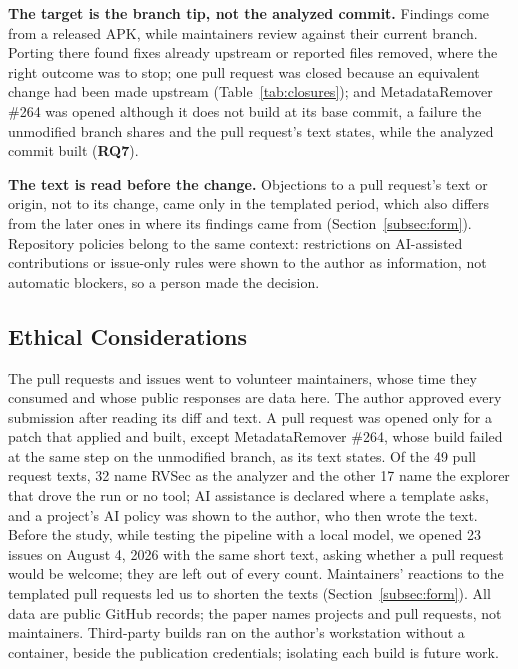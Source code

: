 \documentclass[conference]{IEEEtran}
\newcommand{\researchq}[1]{\textbf{RQ#1}}
\begin{document}
\textbf{The target is the branch tip, not the analyzed commit.} Findings come
from a released APK, while maintainers review against their current branch.
Porting there found fixes already upstream or reported files removed, where
the right outcome was to stop; one pull request was closed because an
equivalent change had been made upstream (Table~\ref{tab:closures}); and
MetadataRemover \#264 was opened although it does not build at its base
commit, a failure the unmodified branch shares and the pull request's text
states, while the analyzed commit built (\researchq{7}).

\textbf{The text is read before the change.} Objections to a pull request's
text or origin, not to its change, came only in the templated period, which
also differs from the later ones in where its findings came from
(Section~\ref{subsec:form}). Repository policies belong to
the same context: restrictions on AI-assisted contributions or issue-only
rules were shown to the author as information, not automatic blockers, so a
person made the decision.

\subsection{Ethical Considerations}
\label{subsec:ethics}

The pull requests and issues went to volunteer maintainers, whose time they
consumed and whose public responses are data here. The author approved every
submission after reading its diff and text. A pull request was opened only for
a patch that applied and built, except MetadataRemover \#264, whose build
failed at the same step on the unmodified branch, as its text states. Of the
49 pull request texts, 32 name RVSec as the analyzer and the other 17 name the
explorer that drove the run or no tool; AI assistance is declared where a
template asks, and a project's AI policy was shown to the author, who then
wrote the text. Before the study, while testing the pipeline with a local
model, we opened 23 issues on August 4, 2026 with the same short text, asking
whether a pull request would be welcome; they are left out of every count.
Maintainers' reactions to the templated pull requests led us to shorten the
texts (Section~\ref{subsec:form}). All data are public GitHub records; the paper
names projects and pull requests, not maintainers. Third-party builds ran on
the author's workstation without a container, beside the publication
credentials; isolating each build is future work.
\end{document}
